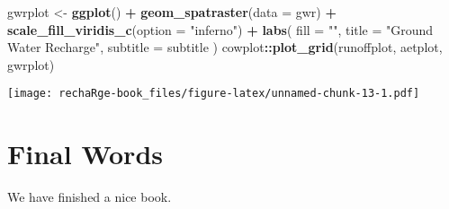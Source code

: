 \documentclass[
]{book}
\newenvironment{Shaded}{\begin{snugshade}}{\end{snugshade}}
\newcommand{\AttributeTok}[1]{\textcolor[rgb]{0.13,0.29,0.53}{#1}}
\newcommand{\FunctionTok}[1]{\textcolor[rgb]{0.13,0.29,0.53}{\textbf{#1}}}
\newcommand{\NormalTok}[1]{#1}
\newcommand{\OtherTok}[1]{\textcolor[rgb]{0.56,0.35,0.01}{#1}}
\newcommand{\SpecialCharTok}[1]{\textcolor[rgb]{0.81,0.36,0.00}{\textbf{#1}}}
\newcommand{\StringTok}[1]{\textcolor[rgb]{0.31,0.60,0.02}{#1}}
\begin{document}
\begin{Shaded}
\begin{Highlighting}[]
\NormalTok{gwrplot }\OtherTok{\textless{}{-}} \FunctionTok{ggplot}\NormalTok{() }\SpecialCharTok{+}
  \FunctionTok{geom\_spatraster}\NormalTok{(}\AttributeTok{data =}\NormalTok{ gwr) }\SpecialCharTok{+}
  \FunctionTok{scale\_fill\_viridis\_c}\NormalTok{(}\AttributeTok{option =} \StringTok{"inferno"}\NormalTok{) }\SpecialCharTok{+}
  \FunctionTok{labs}\NormalTok{(}
    \AttributeTok{fill =} \StringTok{""}\NormalTok{,}
    \AttributeTok{title =} \StringTok{"Ground Water Recharge"}\NormalTok{,}
    \AttributeTok{subtitle =}\NormalTok{ subtitle}
\NormalTok{  )}
\NormalTok{cowplot}\SpecialCharTok{::}\FunctionTok{plot\_grid}\NormalTok{(runoffplot, aetplot, gwrplot)}
\end{Highlighting}
\end{Shaded}

\texttt{[image: rechaRge-book\_files/figure-latex/unnamed-chunk-13-1.pdf]}

\hypertarget{final-words}{%
\chapter{Final Words}\label{final-words}}

We have finished a nice book.

  
\end{document}
